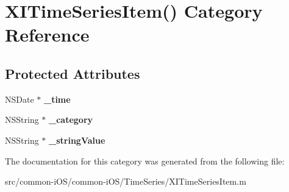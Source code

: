 \hypertarget{category_x_i_time_series_item_07_08}{}\section{X\+I\+Time\+Series\+Item() Category Reference}
\label{category_x_i_time_series_item_07_08}
\subsection*{Protected Attributes}
\begin{DoxyCompactItemize}
\item 
\hypertarget{category_x_i_time_series_item_07_08_a2553561141983d04824046610e5d70a1}{}\label{category_x_i_time_series_item_07_08_a2553561141983d04824046610e5d70a1} 
N\+S\+Date $\ast$ {\bfseries \+\_\+time}
\item 
\hypertarget{category_x_i_time_series_item_07_08_a8c5b0d39eb5e14e74717aef32277ba9c}{}\label{category_x_i_time_series_item_07_08_a8c5b0d39eb5e14e74717aef32277ba9c} 
N\+S\+String $\ast$ {\bfseries \+\_\+category}
\item 
\hypertarget{category_x_i_time_series_item_07_08_a8ed851a86b7b2f17b3b6992cdca617b6}{}\label{category_x_i_time_series_item_07_08_a8ed851a86b7b2f17b3b6992cdca617b6} 
N\+S\+String $\ast$ {\bfseries \+\_\+string\+Value}
\end{DoxyCompactItemize}


The documentation for this category was generated from the following file\+:\begin{DoxyCompactItemize}
\item 
src/common-\/i\+O\+S/common-\/i\+O\+S/\+Time\+Series/X\+I\+Time\+Series\+Item.\+m\end{DoxyCompactItemize}
